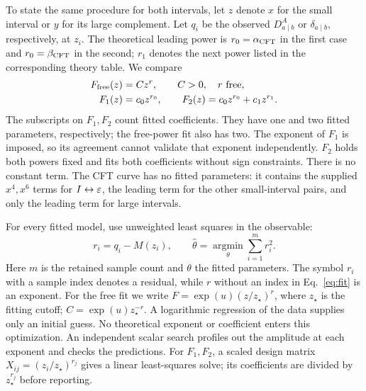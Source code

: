 To state the same procedure for both intervals, let $z$ denote $x$ for
the small interval or $y$ for its large complement. Let $q_i$ be the
observed $D^A_{a\mid b}$ or $\delta_{a\mid b}$, respectively, at $z_i$.
The theoretical leading power is $r_0=\alpha_{\rm CFT}$ in the first
case and $r_0=\beta_{\rm CFT}$ in the second; $r_1$ denotes the next
power listed in the corresponding theory table. We compare
\begin{align}
 F_{\rm free}(z)&=Cz^r,\qquad C>0,\quad r\ \hbox{free},\nonumber\\
 F_1(z)&=c_0z^{r_0},\qquad
 F_2(z)=c_0z^{r_0}+c_1z^{r_1}.
 \label{eq:fit}
\end{align}
The subscripts on $F_1,F_2$ count fitted coefficients. They have one
and two fitted parameters, respectively; the free-power fit also has
two. The exponent of $F_1$ is imposed, so its agreement cannot validate
that exponent independently. $F_2$ holds both powers fixed and fits
both coefficients without sign constraints. There is no constant term.
The CFT curve has no fitted parameters: it contains the supplied
$x^4,x^6$ terms for $I\leftrightarrow\varepsilon$, the leading term for the
other small-interval pairs, and only the leading term for large intervals.

For every fitted model, use unweighted least squares in the observable:
\begin{equation}
 r_i=q_i-M(z_i),\qquad
 \widehat\theta=\underset{\theta}{\operatorname{argmin}}
       \sum_{i=1}^m r_i^2 .
 \label{eq:objective}
\end{equation}
Here $m$ is the retained sample count and $\theta$ the fitted parameters.
The symbol $r_i$ with a sample index denotes a residual, while $r$
without an index in Eq.~\eqref{eq:fit} is an exponent.
For the free fit we write $F=\exp(u)(z/z_\star)^r$, where $z_\star$
is the fitting cutoff; $C=\exp(u)z_\star^{-r}$. A logarithmic regression
of the data supplies only an initial guess. No theoretical exponent or
coefficient enters this optimization. An independent scalar search
profiles out the amplitude at each exponent and checks the predictions.
For $F_1,F_2$, a scaled design matrix
$X_{ij}=(z_i/z_\star)^{r_j}$ gives a linear least-squares solve;
its coefficients are divided by $z_\star^{r_j}$ before reporting.

